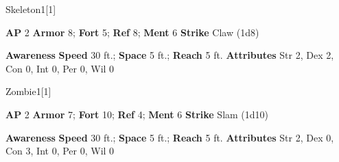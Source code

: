 \begin{monsection}{Skeleton}{1}[1]
\vspace{-1em}\vspace{-1em}
\begin{spellcontent}
\begin{spelltargetinginfo}
{\textbf{AP} 2}
\pari \textbf{Armor} 8;
\textbf{Fort} 5;
\textbf{Ref} 8;
\textbf{Ment} 6
\pari \textbf{Strike} Claw  (1d8)
\end{spelltargetinginfo}
\end{spellcontent}
\begin{spellsubcontent}
\begin{spellfooter}
\pari \textbf{Awareness} 
\pari \textbf{Speed} 30 ft.;
\textbf{Space} 5 ft.;
\textbf{Reach} 5 ft.
\pari \textbf{Attributes}
Str 2,
Dex 2,
Con 0,
Int 0,
Per 0,
Wil 0
\end{spellfooter}
\end{spellsubcontent}
\end{monsection}
\begin{monsection}{Zombie}{1}[1]
\vspace{-1em}\vspace{-1em}
\begin{spellcontent}
\begin{spelltargetinginfo}
{\textbf{AP} 2}
\pari \textbf{Armor} 7;
\textbf{Fort} 10;
\textbf{Ref} 4;
\textbf{Ment} 6
\pari \textbf{Strike} Slam  (1d10)
\end{spelltargetinginfo}
\end{spellcontent}
\begin{spellsubcontent}
\begin{spellfooter}
\pari \textbf{Awareness} 
\pari \textbf{Speed} 30 ft.;
\textbf{Space} 5 ft.;
\textbf{Reach} 5 ft.
\pari \textbf{Attributes}
Str 2,
Dex 0,
Con 3,
Int 0,
Per 0,
Wil 0
\end{spellfooter}
\end{spellsubcontent}
\end{monsection}